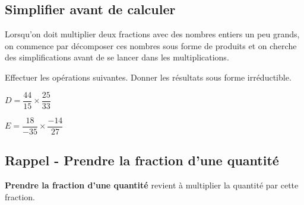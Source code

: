 \documentclass[a4paper]{book}
\begin{document}
    
\subsection{Simplifier avant de calculer}
    
    Lorsqu'on doit multiplier deux fractions avec des nombres entiers un peu grands, on commence par décomposer ces nombres sous forme de produits et on cherche des simplifications avant de se lancer dans les multiplications.
    
    \begin{exemple}
         Effectuer les opérations suivantes. Donner les résultats sous forme irréductible.

         \begin{minipage}{0.45\linewidth}
            $D=\dfrac{44}{15}\times\dfrac{25}{33}$

            \vspace{1.5cm}
        \end{minipage}
        \hfill\vline\hfill
        \begin{minipage}{0.45\linewidth}
            $E=\dfrac{18}{-35}\times\dfrac{-14}{27}$

            \vspace{1.5cm}
        \end{minipage}
    \end{exemple}
    
    
\subsection{Rappel - Prendre la fraction d'une quantité}
    
    \begin{propriete} 
        \textbf{Prendre la fraction d'une quantité} revient à multiplier la quantité par cette fraction.
    \end{propriete}
    
\end{document}
